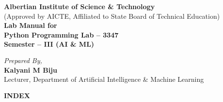 \documentclass[11pt,a4paper]{article}
\begin{document}
\begin{titlepage}
\centering
\vspace*{0.5cm}


\vspace{1.2cm}

{\Huge \textbf{\textcolor{navyblue}{Albertian Institute of Science \& Technology}}}\\[0.4cm]
{\large (Approved by AICTE, Affiliated to State Board of Technical Education)}\\[1.8cm]

{\Huge \textbf{Lab Manual for}}\\[0.8cm]

{\Huge \textbf{\textcolor{navyblue}{Python Programming Lab -- 3347}}}\\[0.6cm]

{\Huge \textbf{Semester -- III (AI \& ML)}}\\[4.0cm]

\vfill

{\Large \textit{Prepared By,}}\\[0.3cm]
{\Large \textbf{Kalyani M Biju}}\\[0.2cm]
{\large Lecturer, Department of Artificial Intelligence \& Machine Learning}

\end{titlepage}

\newpage
\begin{center}
{\Huge \textbf{\textcolor{navyblue}{INDEX}}}\\[0.6cm]
\end{center}

\setlength{\arrayrulewidth}{1pt}
\renewcommand{\arraystretch}{1.4}
\end{document}

